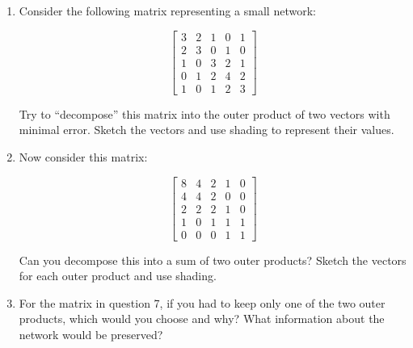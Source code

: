 \documentclass[a4paper, 14pt]{extarticle}
\begin{document}
\begin{enumerate}[resume]
    \item Consider the following matrix representing a small network:

    \[
    \begin{bmatrix}
    3 & 2 & 1 & 0 & 1 \\
    2 & 3 & 0 & 1 & 0 \\
    1 & 0 & 3 & 2 & 1 \\
    0 & 1 & 2 & 4 & 2 \\
    1 & 0 & 1 & 2 & 3
    \end{bmatrix}
    \]

    Try to ``decompose'' this matrix into the outer product of two vectors with minimal error. Sketch the vectors and use shading to represent their values.
    \vspace{3cm}
    \item Now consider this matrix:

    \[
    \begin{bmatrix}
    8 & 4 & 2 & 1 & 0 \\
    4 & 4 & 2 & 0 & 0 \\
    2 & 2 & 2 & 1 & 0 \\
    1 & 0 & 1 & 1 & 1 \\
    0 & 0 & 0 & 1 & 1
    \end{bmatrix}
    \]

    Can you decompose this into a sum of two outer products? Sketch the vectors for each outer product and use shading.
    \vspace{3cm}
    \item For the matrix in question 7, if you had to keep only one of the two outer products, which would you choose and why? What information about the network would be preserved?
    \vspace{3cm}
\end{enumerate}
\end{document}
